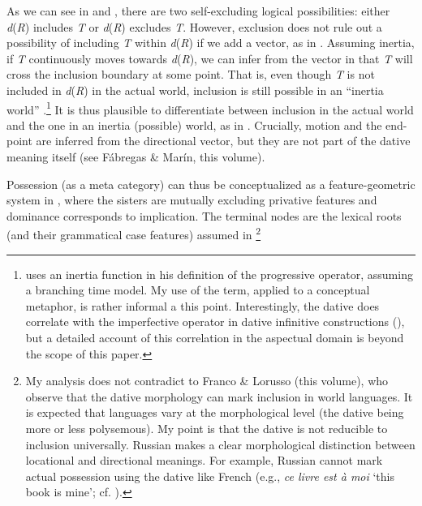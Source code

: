 \documentclass[output=paper,colorlinks,citecolor=brown]{./langscibook}
\begin{document}




As we can see in  and , there are two self-excluding logical possibilities: either \textit{d}(\textit{R}) includes \textit{T} or \textit{d}(\textit{R}) excludes \textit{T}. However, exclusion does not rule out a possibility of including \textit{T} within \textit{d}(\textit{R}) if we add a vector, as in . Assuming inertia, if \textit{T} continuously moves towards \textit{d}(\textit{R}), we can infer from the vector in  that \textit{T} will cross the inclusion boundary at some point. That is, even though \textit{T} is not included in \textit{d}(\textit{R}) in the actual world, inclusion is still possible in an “inertia world” \citep[148]{Dowty1979}.\footnote{\citet{Dowty1979} uses an inertia function in his definition of the progressive operator, assuming a branching time model. My use of the term, applied to a conceptual metaphor, is rather informal a this point. Interestingly, the dative does correlate with the imperfective operator in dative infinitive constructions (), but a detailed account of this correlation in the aspectual domain is beyond the scope of this paper. }  It is thus plausible to differentiate between inclusion in the actual world and the one in an inertia (possible) world, as in . Crucially, motion and the end-point are inferred from the directional vector, but they are not part of the dative meaning itself (see Fábregas \& Marín, this volume).  

Possession (as a meta category) can thus be conceptualized as a feature-geometric system in , where the sisters are mutually excluding privative features and dominance corresponds to implication. The terminal nodes are the lexical roots (and their grammatical case features) assumed in \footnote{My analysis does not contradict to Franco \& Lorusso (this volume), who observe that the dative morphology can mark inclusion in world languages. It is expected that languages vary at the morphological level (the dative being more or less polysemous). My point is that the dative is not reducible to inclusion universally. Russian makes a clear morphological distinction between locational and directional meanings. For example, Russian cannot mark actual possession using the dative like French (e.g., \textit{ce livre est à moi} ‘this book is mine’; cf. ).      }  
\end{document}
